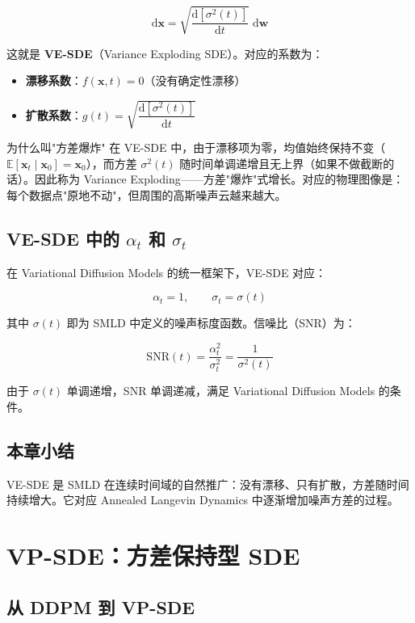 \documentclass[a4paper]{article}
\begin{document}
$$
\mathrm{d}\mathbf{x} = \sqrt{\frac{\mathrm{d}[\sigma^2(t)]}{\mathrm{d}t}}\;\mathrm{d}\mathbf{w}
$$

这就是 \textbf{VE-SDE}（Variance Exploding SDE）。对应的系数为：

\begin{itemize}
    \item \textbf{漂移系数}：$f(\mathbf{x}, t) = 0$（没有确定性漂移）
    \item \textbf{扩散系数}：$g(t) = \sqrt{\dfrac{\mathrm{d}[\sigma^2(t)]}{\mathrm{d}t}}$
\end{itemize}

\begin{knowledgebox}{为什么叫"方差爆炸"}
在 VE-SDE 中，由于漂移项为零，均值始终保持不变（$\mathbb{E}[\mathbf{x}_t \mid \mathbf{x}_0] = \mathbf{x}_0$），而方差 $\sigma^2(t)$ 随时间单调递增且无上界（如果不做截断的话）。因此称为 Variance Exploding——方差"爆炸"式增长。对应的物理图像是：每个数据点"原地不动"，但周围的高斯噪声云越来越大。
\end{knowledgebox}

\subsection{VE-SDE 中的 $\alpha_t$ 和 $\sigma_t$}

在 Variational Diffusion Models 的统一框架下，VE-SDE 对应：

$$
\alpha_t = 1, \qquad \sigma_t = \sigma(t)
$$

其中 $\sigma(t)$ 即为 SMLD 中定义的噪声标度函数。信噪比（SNR）为：

$$
\mathrm{SNR}(t) = \frac{\alpha_t^2}{\sigma_t^2} = \frac{1}{\sigma^2(t)}
$$

由于 $\sigma(t)$ 单调递增，SNR 单调递减，满足 Variational Diffusion Models 的条件。

\subsection{本章小结}

VE-SDE 是 SMLD 在连续时间域的自然推广：没有漂移、只有扩散，方差随时间持续增大。它对应 Annealed Langevin Dynamics 中逐渐增加噪声方差的过程。


\section{VP-SDE：方差保持型 SDE}

\subsection{从 DDPM 到 VP-SDE}
\end{document}
